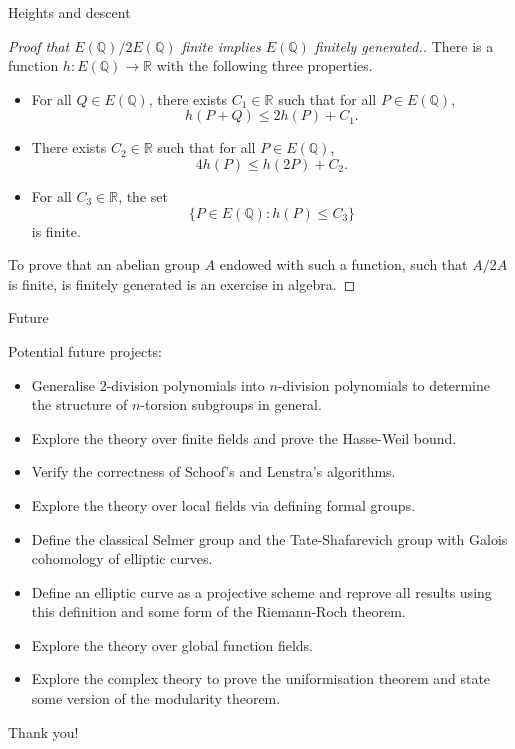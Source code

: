\documentclass[10pt]{beamer}
\begin{document}
\begin{frame}[t]{Heights and descent}

\begin{proof}[Proof that $ E(\mathbb{Q}) / 2E(\mathbb{Q}) $ finite implies $ E(\mathbb{Q}) $ finitely generated.]
There is a function $ h : E(\mathbb{Q}) \to \mathbb{R} $ with the following three properties.
\begin{itemize}
\item For all $ Q \in E(\mathbb{Q}) $, there exists $ C_1 \in \mathbb{R} $ such that for all $ P \in E(\mathbb{Q}) $,
$$ h(P + Q) \le 2h(P) + C_1. $$
\item There exists $ C_2 \in \mathbb{R} $ such that for all $ P \in E(\mathbb{Q}) $,
$$ 4h(P) \le h(2P) + C_2. $$
\item For all $ C_3 \in \mathbb{R} $, the set
$$ \{P \in E(\mathbb{Q}) : h(P) \le C_3\} $$
is finite.
\end{itemize}
To prove that an abelian group $ A $ endowed with such a function, such that $ A / 2A $ is finite, is finitely generated is an exercise in algebra.
\end{proof}

\end{frame}

\begin{frame}{Future}

Potential future projects:
\begin{itemize}
\item Generalise $ 2 $-division polynomials into $ n $-division polynomials to determine the structure of $ n $-torsion subgroups in general.
\item Explore the theory over finite fields and prove the Hasse-Weil bound.
\item Verify the correctness of Schoof's and Lenstra's algorithms.
\item Explore the theory over local fields via defining formal groups.
\item Define the classical Selmer group and the Tate-Shafarevich group with Galois cohomology of elliptic curves.
\item Define an elliptic curve as a projective scheme and reprove all results using this definition and some form of the Riemann-Roch theorem.
\item Explore the theory over global function fields.
\item Explore the complex theory to prove the uniformisation theorem and state some version of the modularity theorem.
\end{itemize}
Thank you!

\end{frame}
\end{document}
